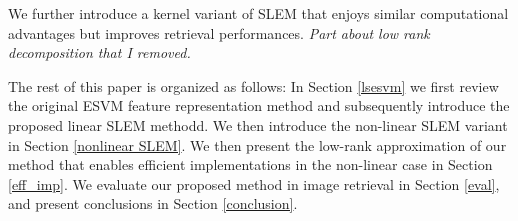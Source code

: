We further introduce a kernel variant of SLEM that enjoys similar computational advantages but improves retrieval performances. \emph{Part about low rank decomposition that I removed.}


The rest of this paper is organized as follows:
In Section \ref{lsesvm} we first review the original ESVM feature representation method and subsequently introduce the proposed linear SLEM methodd. We then introduce the non-linear SLEM variant in Section \ref{nonlinear SLEM}. We then present the low-rank approximation of our method that enables efficient implementations in the non-linear case in  Section \ref{eff_imp}. We evaluate our proposed method in image retrieval in Section \ref{eval}, and present conclusions in Section \ref{conclusion}.








